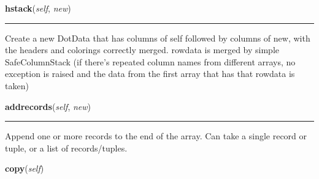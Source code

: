 \hspace{.8\funcindent}\begin{boxedminipage}{\funcwidth}

    \raggedright \textbf{hstack}(\textit{self}, \textit{new})

    \vspace{-1.5ex}

    \rule{\textwidth}{0.5\fboxrule}
\setlength{\parskip}{2ex}
    Create a new DotData that has columns of self followed by columns of 
    new, with the headers and colorings correctly merged.  rowdata is 
    merged by simple SafeColumnStack (if there's repeated column names from
    different arrays, no exception is raised and the data from the first 
    array that has that rowdata is taken)

\setlength{\parskip}{1ex}
    \end{boxedminipage}

    \label{Classes:DotData:DotData:addrecords}

    \vspace{0.5ex}

\hspace{.8\funcindent}\begin{boxedminipage}{\funcwidth}

    \raggedright \textbf{addrecords}(\textit{self}, \textit{new})

    \vspace{-1.5ex}

    \rule{\textwidth}{0.5\fboxrule}
\setlength{\parskip}{2ex}
    Append one or more records to the end of the array. Can take a single 
    record or tuple, or a list of records/tuples.

\setlength{\parskip}{1ex}
    \end{boxedminipage}

    \label{Classes:DotData:DotData:copy}

    \vspace{0.5ex}

\hspace{.8\funcindent}\begin{boxedminipage}{\funcwidth}

    \raggedright \textbf{copy}(\textit{self})

\setlength{\parskip}{2ex}
\setlength{\parskip}{1ex}
    \end{boxedminipage}

